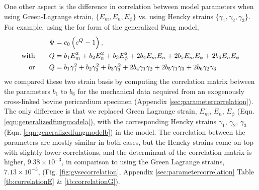 	One other aspect is the difference in correlation between model parameters when using Green-Lagrange strain, $\{E_m, E_n, E_\phi\}$ vs. using Hencky strains $\{\gamma_1, \gamma_2, \gamma_3 \}$. For example, using the for form of the generalized Fung model,
\begin{subequations} \label{eqn:generalizedfungmodel}
\begin{align}
\Psi 	&= c_0 \left(e^{Q} - 1\right),\notag \\
\mathrm{with}	\qquad	Q	&= b_1 E_m^2 + b_2 E_n^2 + b_3 E_\phi^2 + 2 b_4 E_m E_n + 2 b_5 E_mE_\phi + 2 b_6 E_nE_\phi	\label{eqn:generalizedfungmodela} \\ 
\mathrm{or}		\qquad	Q	&= b_1 \gamma_1^2 + b_2 \gamma_2^2 + b_3 \gamma_3^2 + 2 b_4 \gamma_1\gamma_2 + 2 b_5 \gamma_1\gamma_3 + 2 b_6 \gamma_2\gamma_3	\label{eqn:generalizedfungmodelb} 
\end{align}
\end{subequations}
    we compared these two strain basis by computing the correlation matrix between the parameters $b_1$ to $b_6$ for the mechanical data acquired from an exogenously cross-linked bovine pericardium specimen \cite{sun_response_2004} (Appendix \ref{sec:parametercorrelation}). The only difference is that we replaced Green Lagrange strain, $E_m$, $E_n$, $E_\phi$ (Eqn. \ref{eqn:generalizedfungmodela}), with the corresponding Hencky strains $\gamma_1$, $\gamma_2$, $\gamma_3$ (Eqn. \ref{eqn:generalizedfungmodelb}) in the model. The correlation between the parameters are mostly similar in both cases, but the Hencky strains come on top with slightly lower correlations, and the determinant of the correlation matrix is higher, $9.38\times10^{-3}$, in comparison to using the Green Lagrange strains, $7.13\times10^{-3}$, (Fig. \ref{fig:gvsecorrelation}, Appendix \ref{sec:parametercorrelation} Table \ref{tb:correlationE} \& \ref{tb:correlationG}). 



